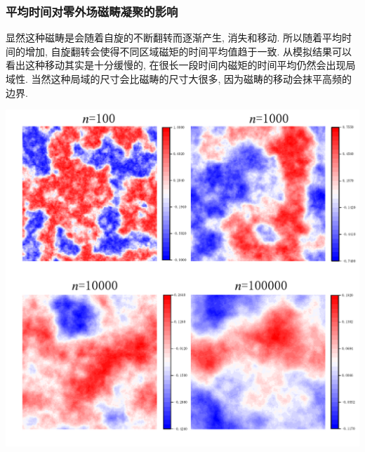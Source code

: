\documentclass[UTF8]{ctexart}
\begin{document}
            \subsubsection{平均时间对零外场磁畴凝聚的影响}
                \indent 显然这种磁畴是会随着自旋的不断翻转而逐渐产生, 消失和移动. 所以随着平均时间的增加, 自旋翻转会使得不同区域磁矩的时间平均值趋于一致.
                从模拟结果可以看出这种移动其实是十分缓慢的, 在很长一段时间内磁矩的时间平均仍然会出现局域性. 当然这种局域的尺寸会比磁畴的尺寸大很多,
                因为磁畴的移动会抹平高频的边界.
                \begin{center}
                    \includegraphics[width=17cm]{4_Num_Grids.pdf}
                \end{center}
                \newpage
\end{document}
